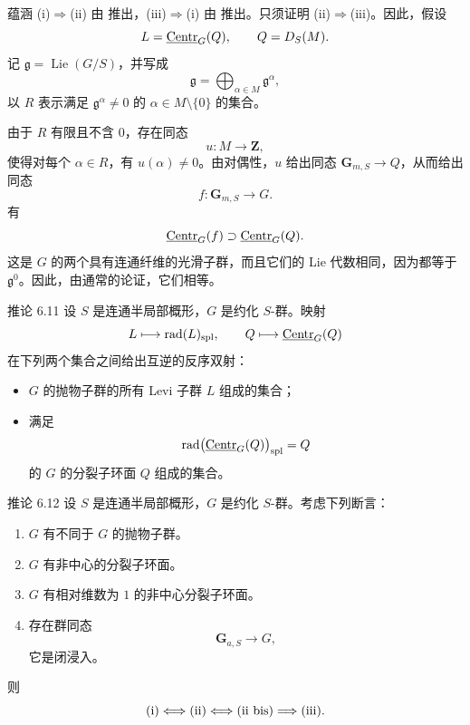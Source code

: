 蕴涵 \textup{(i)}\(\Rightarrow\)\textup{(ii)} 由  推出，\textup{(iii)}\(\Rightarrow\)\textup{(i)} 由  推出。只须证明 \textup{(ii)}\(\Rightarrow\)\textup{(iii)}。因此，假设
\[
 L=\underline{\operatorname{Centr}}_G(Q),\qquad Q=D_S(M).
\]
记 \(\mathfrak g=\operatorname{Lie}(G/S)\)，并写成
\[
 \mathfrak g=\bigoplus_{\alpha\in M}\mathfrak g^\alpha,
\]
以 \(R\) 表示满足 \(\mathfrak g^\alpha\ne0\) 的 \(\alpha\in M\setminus\{0\}\) 的集合。

由于 \(R\) 有限且不含 \(0\)，存在同态
\[
 u:M\longrightarrow\mathbf Z,
\]
使得对每个 \(\alpha\in R\)，有 \(u(\alpha)\ne0\)。由对偶性，\(u\) 给出同态 \(\mathbf G_{m,S}\to Q\)，从而给出同态
\[
 f:\mathbf G_{m,S}\longrightarrow G.
\]
有
\[
 \underline{\operatorname{Centr}}_G(f)\supset\underline{\operatorname{Centr}}_G(Q).
\]
这是 \(G\) 的两个具有连通纤维的光滑子群，而且它们的 Lie 代数相同，因为都等于 \(\mathfrak g^0\)。因此，由通常的论证，它们相等。

\begin{sgastatement}{推论 6.11}
设 \(S\) 是连通半局部概形，\(G\) 是约化 \(S\)-群。映射
\[
 L\longmapsto\operatorname{rad}(L)_{\mathrm{spl}},
 \qquad
 Q\longmapsto\underline{\operatorname{Centr}}_G(Q)
\]
在下列两个集合之间给出互逆的反序双射：
\begin{itemize}
\item \(G\) 的抛物子群的所有 Levi 子群 \(L\) 组成的集合；
\item 满足
\[
 \operatorname{rad}\bigl(\underline{\operatorname{Centr}}_G(Q)\bigr)_{\mathrm{spl}}=Q
\]
的 \(G\) 的分裂子环面 \(Q\) 组成的集合。
\end{itemize}
\end{sgastatement}

\begin{sgastatement}{推论 6.12}
设 \(S\) 是连通半局部概形，\(G\) 是约化 \(S\)-群。考虑下列断言：
\begin{enumerate}[label=\textup{(\roman*)}]
\item \(G\) 有不同于 \(G\) 的抛物子群。
\item \(G\) 有非中心的分裂子环面。
\item[\textup{(ii bis)}] \(G\) 有相对维数为 \(1\) 的非中心分裂子环面。
\item 存在群同态
\[
 \mathbf G_{a,S}\longrightarrow G,
\]
它是闭浸入。
\end{enumerate}
则
\[
 \textup{(i)}
 \Longleftrightarrow\textup{(ii)}
 \Longleftrightarrow\textup{(ii bis)}
 \Longrightarrow\textup{(iii)}.
\]
\end{sgastatement}

